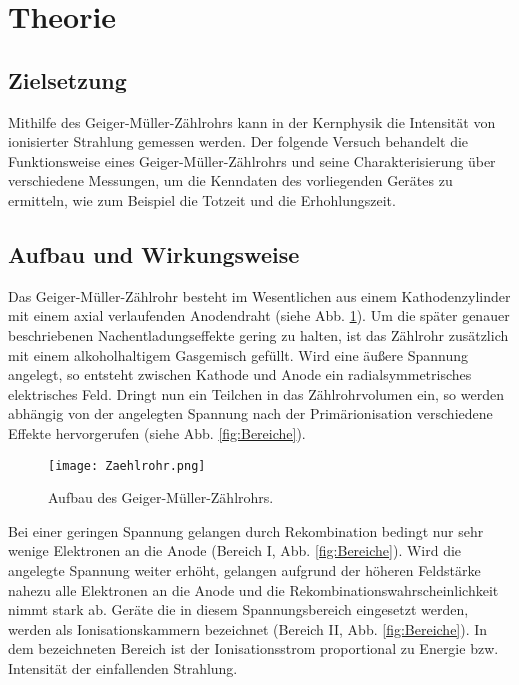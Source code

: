 \section{Theorie}

\subsection{Zielsetzung}

Mithilfe des Geiger-Müller-Zählrohrs kann in der Kernphysik die Intensität von
ionisierter Strahlung gemessen werden. Der folgende Versuch behandelt
die Funktionsweise eines Geiger-Müller-Zählrohrs und seine Charakterisierung
über verschiedene Messungen, um die Kenndaten des vorliegenden Gerätes zu ermitteln,
wie zum Beispiel die Totzeit und die Erhohlungszeit.

\subsection{Aufbau und Wirkungsweise}

Das Geiger-Müller-Zählrohr besteht im Wesentlichen aus einem Kathodenzylinder
mit einem axial verlaufenden Anodendraht (siehe Abb. \ref{fig:Geiger}). Um die
später genauer beschriebenen Nachentladungseffekte gering zu halten, ist das
Zählrohr zusätzlich mit einem alkoholhaltigem Gasgemisch gefüllt. Wird eine
äußere Spannung angelegt, so entsteht zwischen Kathode und Anode ein
radialsymmetrisches elektrisches Feld. Dringt nun ein Teilchen in das Zählrohrvolumen ein,
so werden abhängig von der angelegten Spannung nach der Primärionisation
verschiedene Effekte hervorgerufen (siehe Abb. \ref{fig:Bereiche}).

\begin{figure}
  \centering
  \texttt{[image: Zaehlrohr.png]}
  \caption{Aufbau des Geiger-Müller-Zählrohrs. \cite{anleitung01}}
  \label{fig:Geiger}
\end{figure}

Bei einer geringen Spannung gelangen durch Rekombination bedingt nur sehr
wenige Elektronen an die Anode (Bereich I, Abb. \ref{fig:Bereiche}). Wird die
angelegte Spannung weiter erhöht, gelangen aufgrund der höheren Feldstärke nahezu
alle Elektronen an die Anode und die Rekombinationswahrscheinlichkeit nimmt
stark ab. Geräte die in diesem Spannungsbereich eingesetzt werden, werden als
Ionisationskammern bezeichnet (Bereich II, Abb. \ref{fig:Bereiche}).
In dem bezeichneten Bereich ist der Ionisationsstrom proportional zu Energie bzw.
Intensität der einfallenden Strahlung.

